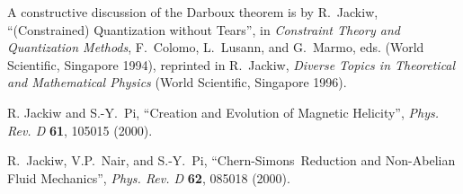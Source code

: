 \documentclass[a4paper,12pt,twoside]{article}
\providecommand{\CS}{Chern-Simons}
\def\Journal#1#2#3#4{{\em #1} {\bf #2}, #3 (#4)}
\def\Book#1#2#3#4{{\em #1}  (#2, #3 #4)}
\def\Bookeds#1#2#3#4#5{{\em #1}, #2  (#3, #4 #5)}
\def\PRD{Phys. Rev. D}
\begin{document}
\begin{thebibliography}{99}
A constructive discussion of the Darboux theorem is by R.~Jackiw, ``(Constrained)
Quantization without Tears'', in 
\Bookeds{Constraint Theory and Quantization Methods}{F.~Colomo,
L.~Lusann, and G.~Marmo, eds.}{World Scientific}{Singapore}{1994}, reprinted in
R.~Jackiw,
\Book{Diverse Topics in Theoretical and Mathematical Physics}{World
Scientific}{Singapore}{1996}.

R. Jackiw and S.-Y.~Pi, ``Creation and Evolution of Magnetic Helicity'',
\Journal{\PRD}{61}{105015}{2000}.

 R.~Jackiw, V.P.~Nair, and S.-Y.~Pi, ``\CS\
Reduction and Non-Abelian Fluid Mechanics'', \Journal{\PRD}{62}{085018}{2000}.


\end{thebibliography}
\end{document}
